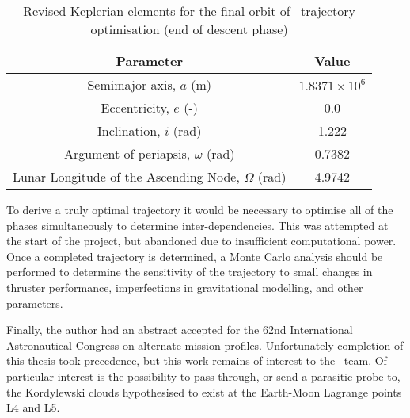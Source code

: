 \begin{table}[h]
\caption{Revised Keplerian elements for the final orbit of \BW\ trajectory optimisation (end of descent phase)}
\label{tab:Phase-5-constraints-revised}
\begin{center}
\begin{tabular} {cc}\toprule
Parameter & Value\\\midrule
Semimajor axis, $a$ (m) & $1.8371\times 10^6$\\
Eccentricity, $e$ (-) & 0.0\\
Inclination, $i$ (rad) & 1.222\\
Argument of periapsis, $\omega$ (rad) & 0.7382 \\
Lunar Longitude of the Ascending Node, $\Omega$ (rad) & 4.9742 \\\bottomrule
\end{tabular}
\end{center}
\end{table}

To derive a truly optimal trajectory it would be necessary to optimise all of the phases simultaneously to determine inter-dependencies. This was attempted at the start of the project, but abandoned due to insufficient computational power. Once a completed trajectory is determined, a Monte Carlo analysis should be performed to determine the sensitivity of the trajectory to small changes in thruster performance, imperfections in gravitational modelling, and other parameters.

Finally, the author had an abstract accepted for the 62nd International Astronautical Congress on alternate mission profiles. Unfortunately completion of this thesis took precedence, but this work remains of interest to the \BW\ team. Of particular interest is the possibility to pass through, or send a parasitic probe to, the Kordylewski clouds hypothesised to exist at the Earth-Moon Lagrange points L4 and L5.


